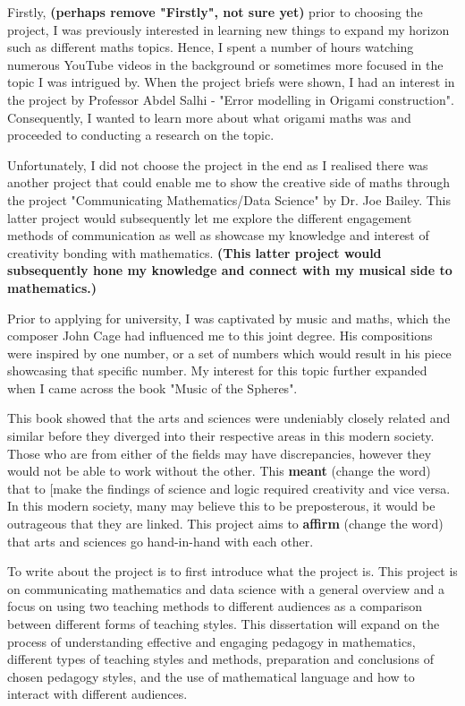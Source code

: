 \documentclass[12pt, a4paper,oneside]{book}
\numberwithin{equation}{section}
\begin{document}
Firstly, {\color{blue}\textbf{(perhaps remove "Firstly", not sure yet)}} prior to choosing the project, I was previously interested in learning new things to expand my horizon such as different maths topics. Hence, I spent a number of hours watching numerous YouTube videos in the background or sometimes more focused in the topic I was intrigued by. When the project briefs were shown, I had an interest in the project by Professor Abdel Salhi - "Error modelling in Origami construction". Consequently, I wanted to learn more about what origami maths was and proceeded to conducting a research on the topic.

Unfortunately, I did not choose the project in the end as I realised there was another project that could enable me to show the creative side of maths through the project "Communicating Mathematics/Data Science" by Dr. Joe Bailey. This latter project would subsequently let me explore the different engagement methods of communication as well as showcase my knowledge and interest of creativity bonding with mathematics. {\color{red}\textbf{(This latter project would subsequently hone my knowledge and connect with my musical side to mathematics.)}}

Prior to applying for university, I was captivated by music and maths, which the composer John Cage had influenced me to this joint degree. His compositions were inspired by one number, or a set of numbers which would result in his piece showcasing that specific number. My interest for this topic further expanded when I came across the book "Music of the Spheres".

This book showed that the arts and sciences were undeniably closely related and similar before they diverged into their respective areas in this modern society. Those who are from either of the fields may have discrepancies, however they would not be able to work without the other. This {\color{red}\textbf{meant}} (change the word) that to [make the findings of science and logic required creativity and vice versa. In this modern society, many may believe this to be preposterous, it would be outrageous that they are linked. This project aims to {\color{red}\textbf{affirm}} (change the word) that arts and sciences go hand-in-hand with each other.

\newline To write about the project is to first introduce what the project is. This project is on communicating mathematics and data science with a general overview and a focus on using two teaching methods to different audiences as a comparison between different forms of teaching styles. This dissertation will expand on the process of understanding effective and engaging pedagogy in mathematics, different types of teaching styles and methods, preparation and conclusions of chosen pedagogy styles, and the use of mathematical language and how to interact with different audiences.
\end{document}
